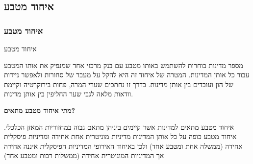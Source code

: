 \documentclass[dvipsnames]{beamer}
\begin{document}
\begin{RTL}
\section{איחוד מטבע}
\begin{frame}
    \frametitle{איחוד מטבע}
    \begin{block}{איחוד מטבע}
        
    מספר מדינות בוחרות להשתמש באותו מטבע עם בנק מרכזי אחד שמנפיק את אותו המטבע עבור כל אותן המדינות. המטרה של איחוד זה היא להקל על מעבר של סחורות ולאפשר ניידות של הון ועובדים בין אותן מדינות. בדרך זו נחתכים שערי המרה, פחות בירוקרטיה וקיימת וודאות מלאה לגבי שער החליפין בין אותן מדינות.

\textbf{מתי איחוד מטבע מתאים?}

איחוד מטבע מתאים למדינות אשר קיימים ביניהן מתאם גבוה במחזוריות המאזן הכלכלי. איחוד מטבע כופה על כל אותן המדינות מדיניות מוניטרית אחת אחידה ומדיניות פיסקלית אחידה (ממשלה אחת ומטבע אחד) ולכן באיחוד האירופי המדיניות הפיסקלית איננה אחידה אך המדיניות המוניטרית אחידה (ממשלות רבות ומטבע אחד)
\end{block}
    

\end{frame}
\end{RTL}
\end{document}
